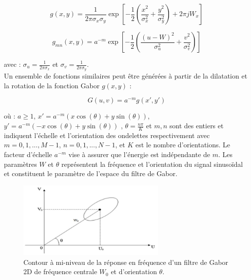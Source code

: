 \begin{equation}
	g(x, y) = \frac{1}{2\pi \sigma_x \sigma_y} \exp\left[-\frac{1}{2} (\frac{x^2}{\sigma_x^2} + \frac{y^2}{\sigma_y^2}) + 2\pi j W_x\right]
\end{equation}

\begin{equation}
	g_{mn}(x, y) = a^{-m} \exp\left[-\frac{1}{2} (\frac{(u-W)^2}{\sigma_u^2} + \frac{v^2}{\sigma_v^2})\right] 
\end{equation}


 avec : $\sigma_u = \frac{1}{2\pi \sigma_x } $ et  $ \sigma_v = \frac{1}{2\pi  \sigma_y} $. \\
 
 Un ensemble de fonctions similaires peut être générées à partir de la dilatation et la rotation de la fonction Gabor $g(x, y)$ :
 

\begin{equation}
 	G(u, v) = a^{-m} g(x', y')
\end{equation}


 où : $a \ge 1 $, $x' = a^{-m} ( x \cos(\theta) + y \sin(\theta) )$,  $y' = a^{-m} ( -x \cos(\theta) + y \sin(\theta) )$ , $\theta = \frac{n\pi}{K}$ et $m,n$ sont des entiers et indiquent l'échelle et l’orientation des ondelettes respectivement avec $m = 0,1,..., M-1 $,  $n=0,1,..., N-1$, et $K$ est le nombre d'orientations. Le facteur d’échelle $ a^{-m} $ vise à assurer que l'énergie est indépendante de $m$. Les paramètres $W$ et $\theta$ représentent la fréquence et l'orientation du signal sinusoïdal et constituent le paramètre de l'espace du filtre de Gabor.\\

\begin{figure}[H]
	\label{fig:gaborFig}
	\centering
	\includegraphics[width=0.65\textwidth]{Figures/gaborFig} %
	
	\caption{Contour à mi-niveau de la réponse en fréquence d’un filtre de Gabor 2D de fréquence centrale $W_0$ et d’orientation $\theta$.}
	
\end{figure}

